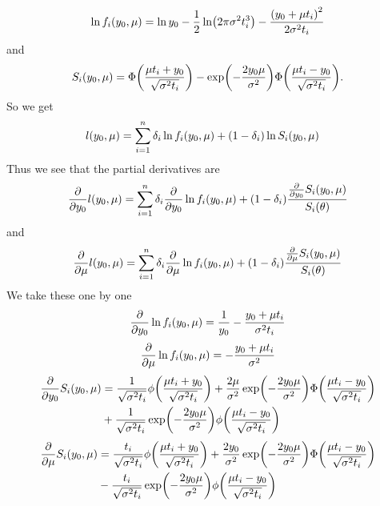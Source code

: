 \begin{equation}
\ln{f_i}(y_0, \mu)=\ln y_0-\frac{1}{2}\ln\p*{2\pi\sigma^2\ti^3}-\frac{\p*{y_0+\mu\ti}^2}{2\sigma^2\ti}
\end{equation}
and
\begin{equation}
S_i(y_0, \mu)=\Phi\p*{\frac{\mu\ti+y_0}{\sqrt{\sigma^2\ti}}}-\exp\p*{-\frac{2y_0\mu}{\sigma^2}}\Phi\p*{\frac{\mu\ti-y_0}{\sqrt{\sigma^2\ti}}}.
\end{equation}
So we get
\begin{align}
    l(y_0, \mu)&=\sum_{i=1}^n\delta_{i} \ln{f_i}(y_0, \mu)+(1-\delta_{i})\ln{S_i(y_0, \mu)}
\end{align}
Thus we see that the partial derivatives are
\begin{equation}
    \frac{\partial}{\partial y_0}l(y_0, \mu)=\sum_{i=1}^n\delta_{i} \frac{\partial}{\partial y_0}\ln{f_i}(y_0, \mu)+(1-\delta_{i})\frac{\frac{\partial}{\partial y_0}S_i(y_0, \mu)}{S_i(\theta)}
\end{equation}
and
\begin{equation}
    \frac{\partial}{\partial \mu}l(y_0, \mu)=\sum_{i=1}^n\delta_{i} \frac{\partial}{\partial \mu}\ln{f_i}(y_0, \mu)+(1-\delta_{i})\frac{\frac{\partial}{\partial \mu}S_i(y_0, \mu)}{S_i(\theta)}
\end{equation}
We take these one by one
\begin{equation}
    \frac{\partial}{\partial y_0}\ln{f_i}(y_0, \mu)=\frac{1}{y_0}-\frac{y_0+\mu t_{i}}{\sigma^2t_{i}}
\end{equation}
\begin{equation}
    \frac{\partial}{\partial \mu}\ln{f_i}(y_0, \mu)=-\frac{y_0+\mu t_{i}}{\sigma^2}
\end{equation}
\begin{align}
\begin{split}
    \frac{\partial}{\partial y_0}S_i(y_0, \mu)&=\frac{1}{\sqrt{\sigma^2\ti}}\phi\p*{\frac{\mu\ti+y_0}{\sqrt{\sigma^2\ti}}}+\frac{2\mu}{\sigma^2}\exp\p*{-\frac{2y_0\mu}{\sigma^2}}\Phi\p*{\frac{\mu\ti-y_0}{\sqrt{\sigma^2\ti}}} \\
    &+
    \frac{1}{\sqrt{\sigma^2\ti}}\exp\p*{-\frac{2y_0\mu}{\sigma^2}}\phi\p*{\frac{\mu\ti-y_0}{\sqrt{\sigma^2\ti}}}
\end{split}
\end{align}
\begin{align}
\begin{split}
    \frac{\partial}{\partial \mu}S_i(y_0, \mu)&=\frac{\ti}{\sqrt{\sigma^2\ti}}\phi\p*{\frac{\mu\ti+y_0}{\sqrt{\sigma^2\ti}}}+\frac{2y_0}{\sigma^2}\exp\p*{-\frac{2y_0\mu}{\sigma^2}}\Phi\p*{\frac{\mu\ti-y_0}{\sqrt{\sigma^2\ti}}} \\
    &-
    \frac{\ti}{\sqrt{\sigma^2\ti}}\exp\p*{-\frac{2y_0\mu}{\sigma^2}}\phi\p*{\frac{\mu\ti-y_0}{\sqrt{\sigma^2\ti}}}
\end{split}
\end{align}

